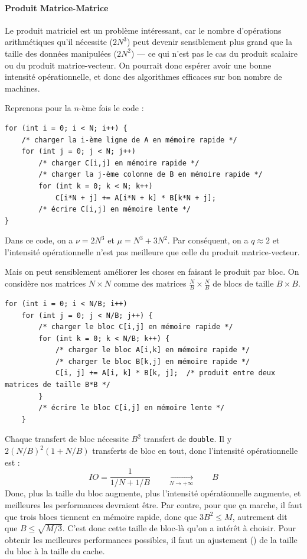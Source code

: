 \paragraph{Produit Matrice-Matrice} Le produit matriciel est un problème
intéressant, car le nombre d'opérations arithmétiques qu'il nécessite ($2N^3$)
peut devenir sensiblement plus grand que la taille des données manipulées
($2N^2$) --- ce qui n'est pas le cas du produit scalaire ou du produit
matrice-vecteur. On pourrait donc espérer avoir une bonne intensité
opérationnelle, et donc des algorithmes efficaces sur bon nombre de machines.

Reprenons pour la $n$-ème fois le code :

\begin{verbatim}
for (int i = 0; i < N; i++) {
    /* charger la i-ème ligne de A en mémoire rapide */
    for (int j = 0; j < N; j++)
        /* charger C[i,j] en mémoire rapide */
        /* charger la j-ème colonne de B en mémoire rapide */
        for (int k = 0; k < N; k++)
            C[i*N + j] += A[i*N + k] * B[k*N + j];
        /* écrire C[i,j] en mémoire lente */
}
\end{verbatim}

Dans ce code, on a $\nu = 2N^3$ et $\mu = N^3 + 3N^2$. Par conséquent, on a
$q \approx 2$ et l'intensité opérationnelle n'est pas meilleure que celle du
produit matrice-vecteur.

Mais on peut sensiblement améliorer les choses en faisant le produit \og par
bloc\fg. On considère nos matrices $N \times N$ comme des matrices
$\frac{N}{B} \times \frac{N}{B}$ de blocs de taille $B \times B$.

\begin{verbatim}
for (int i = 0; i < N/B; i++)
    for (int j = 0; j < N/B; j++) {
        /* charger le bloc C[i,j] en mémoire rapide */
        for (int k = 0; k < N/B; k++) {
            /* charger le bloc A[i,k] en mémoire rapide */
            /* charger le bloc B[k,j] en mémoire rapide */
            C[i, j] += A[i, k] * B[k, j];  /* produit entre deux matrices de taille B*B */
        }
        /* écrire le bloc C[i,j] en mémoire lente */
    }
\end{verbatim}

Chaque transfert de bloc nécessite $B^2$ transfert de \texttt{double}. Il y
$2 (N/B)^2 (1 + N/B)$ transferts de bloc en tout, donc l'intensité opérationnelle
est :
\[
IO = \frac{1}{1/N + 1/B} \qquad \xrightarrow[N \rightarrow +\infty]{} \qquad B
\]
Donc, plus la taille du bloc augmente, plus l'intensité opérationnelle augmente,
et meilleures les performances devraient être. Par contre, pour que ça marche,
il faut que trois blocs tiennent en mémoire rapide, donc que $3B^2 \leq M$,
autrement dit que $B \leq \sqrt{M/3}$. C'est donc cette taille de bloc-là qu'on
a intérêt à choisir. Pour obtenir les meilleures performances possibles, il faut
un ajustement (\og {}\fg) de la taille du bloc à la taille du
cache.

